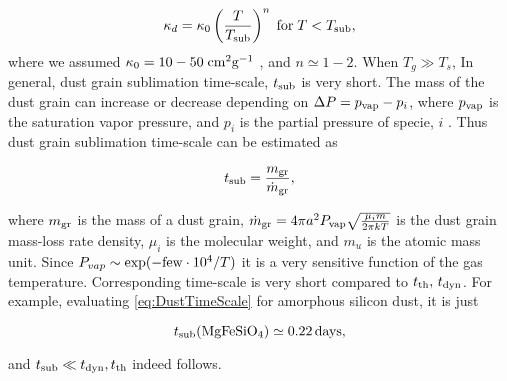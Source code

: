 \documentclass[12pt,english,preprint]{aastex}
\newcommand{\su}[2]{#1_{\rm #2}}
\begin{document}
\begin{equation}
\kappa_{d}=\kappa_{0}\left(\frac{T}{T_{{\rm sub}}}\right)^{n}\;{\rm for}\;T<T_{{\rm sub}},
\end{equation}
where we assumed $\kappa_{0}=10-50\;{\rm cm}^{2}\textrm{g}^{-1}$
\citep{Semenov03}, and $n\simeq1-2.$ When $T_{g}\gg T_{s}$, In general,
dust grain sublimation time-scale, $t_{{\rm sub}}$ is very short.
The mass of the dust grain can increase or decrease depending on $\Delta P=p_{{\rm vap}}-p_{i}$,
where $p_{{\rm vap}}$ is the saturation vapor pressure, and $p_{i}$
is the partial pressure of specie, $i$ \citep{Phinney89}. Thus dust grain
sublimation time-scale can be estimated as

\begin{equation}
t_{{\rm sub}}=\frac{m_{{\rm gr}}}{\dot{m}_{{\rm gr}}},\label{eq:DustTimeScale}
\end{equation}

\noindent where $m_{{\rm gr}}$ is the mass of a dust grain, $\dot{m}_{{\rm gr}}=4\pi a^{2}P_{{\rm vap}}\sqrt{\frac{\mu_{i}m}{2\pi kT}}$
is the dust grain mass-loss rate density, $\mu_{i}$ is the molecular
weight, and $m_{u}$ is the atomic mass unit. Since $P_{vap}\sim\exp(-{\rm few}\cdot10^{4}/T)$
it is a very sensitive function of the gas temperature. Corresponding 
time-scale is very short compared to $\su{t}{th},\,\su{t}{dyn}$.
For example,
evaluating \eqref{eq:DustTimeScale} for amorphous silicon dust, it
is just

\begin{equation}
t_{{\rm sub}}({\rm MgFeSiO_{4})}\simeq0.22\,{\rm days\mbox{,}}
\end{equation}

\noindent and $t_{{\rm sub}}\ll t_{{\rm dyn}},\su{t}{th} $ indeed follows.



\end{document}
